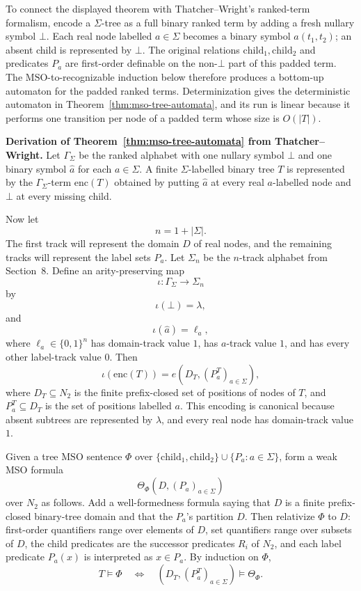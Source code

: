 \documentclass[11pt]{article}
\theoremstyle{definition}
\newcommand{\TW}{Thatcher--Wright}
\newcommand{\MSO}{\mathrm{MSO}}
\newcommand{\child}{\mathrm{child}}
\newcommand{\enc}{\mathrm{enc}}
\begin{document}
To connect the displayed theorem with \TW{}'s ranked-term formalism, encode a
\(\Sigma\)-tree as a full binary ranked term by adding a fresh nullary symbol
\(\bot\).  Each real node labelled \(a\in\Sigma\) becomes a binary symbol
\(a(t_1,t_2)\); an absent child is represented by \(\bot\).  The original
relations \(\child_1,\child_2\) and predicates \(P_a\) are first-order definable
on the non-\(\bot\) part of this padded term.  The \(\MSO\)-to-recognizable
induction below therefore produces a bottom-up automaton for the padded ranked
terms.  Determinization gives the deterministic automaton in
Theorem~\ref{thm:mso-tree-automata}, and its run is linear because it performs
one transition per node of a padded term whose size is \(O(|T|)\).

\medskip
\noindent\textbf{Derivation of Theorem~\ref{thm:mso-tree-automata} from \TW{}.}
Let \(\Gamma_\Sigma\) be the ranked alphabet with one nullary symbol \(\bot\)
and one binary symbol \(\widehat a\) for each \(a\in\Sigma\).  A finite
\(\Sigma\)-labelled binary tree \(T\) is represented by the
\(\Gamma_\Sigma\)-term \(\enc(T)\) obtained by putting \(\widehat a\) at every
real \(a\)-labelled node and \(\bot\) at every missing child.

Now let
\[
  n=1+|\Sigma|.
\]
The first track will represent the domain \(D\) of real nodes, and the remaining
tracks will represent the label sets \(P_a\).  Let \(\Sigma_n\) be the
\(n\)-track alphabet from Section~8.  Define an arity-preserving map
\[
  \iota:\Gamma_\Sigma\to\Sigma_n
\]
by
\[
  \iota(\bot)=\lambda,
\]
and
\[
  \iota(\widehat a)=\ell_a,
\]
where \(\ell_a\in\{0,1\}^n\) has domain-track value \(1\), has \(a\)-track value
\(1\), and has every other label-track value \(0\).  Then
\[
  \iota(\enc(T))=e(D_T,(P_a^T)_{a\in\Sigma}),
\]
where \(D_T\subseteq N_2\) is the finite prefix-closed set of positions of
nodes of \(T\), and \(P_a^T\subseteq D_T\) is the set of positions labelled
\(a\).  This encoding is canonical because absent subtrees are represented by
\(\lambda\), and every real node has domain-track value \(1\).

Given a tree \(\MSO\) sentence \(\Phi\) over
\(\{\child_1,\child_2\}\cup\{P_a:a\in\Sigma\}\), form a weak MSO formula
\[
  \Theta_\Phi(D,(P_a)_{a\in\Sigma})
\]
over \(N_2\) as follows.  Add a well-formedness formula saying that \(D\) is a
finite prefix-closed binary-tree domain and that the \(P_a\)'s partition \(D\).
Then relativize \(\Phi\) to \(D\): first-order quantifiers range over elements of
\(D\), set quantifiers range over subsets of \(D\), the child predicates are the
successor predicates \(R_i\) of \(N_2\), and each label predicate \(P_a(x)\) is
interpreted as \(x\in P_a\).  By induction on \(\Phi\),
\[
  T\models\Phi
  \quad\Longleftrightarrow\quad
  (D_T,(P_a^T)_{a\in\Sigma})\models\Theta_\Phi.        \tag{1}
\]
\end{document}

